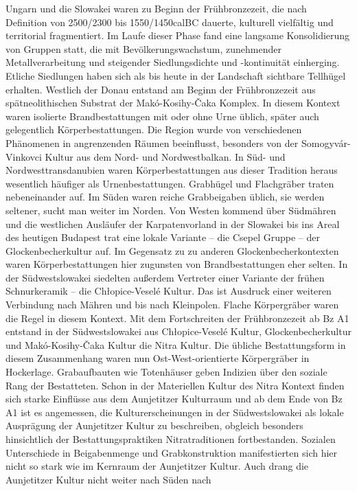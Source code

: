 \documentclass[openany,twoside,twocolumn]{book}
\begin{document}
Ungarn und die Slowakei waren zu Beginn der Frühbronzezeit, die nach
Definition von 2500/2300 bis 1550/1450calBC dauerte, kulturell
vielfältig und territorial fragmentiert. Im Laufe dieser Phase fand eine
langsame Konsolidierung von Gruppen statt, die mit Bevölkerungswachstum,
zunehmender Metallverarbeitung und steigender Siedlungsdichte und
-kontinuität einherging. Etliche Siedlungen haben sich als bis heute in
der Landschaft sichtbare Tellhügel erhalten. Westlich der Donau entstand
am Beginn der Frühbronzezeit aus spätneolithischen Substrat der
Makó-Kosihy-Čaka Komplex. In diesem Kontext waren isolierte
Brandbestattungen mit oder ohne Urne üblich, später auch gelegentlich
Körperbestattungen. Die Region wurde von verschiedenen Phänomenen in
angrenzenden Räumen beeinflusst, besonders von der Somogyvár-Vinkovci
Kultur aus dem Nord- und Nordwestbalkan. In Süd- und
Nordwesttransdanubien waren Körperbestattungen aus dieser Tradition
heraus wesentlich häufiger als Urnenbestattungen. Grabhügel und
Flachgräber traten nebeneinander auf. Im Süden waren reiche Grabbeigaben
üblich, sie werden seltener, sucht man weiter im Norden. Von Westen
kommend über Südmähren und die westlichen Ausläufer der Karpatenvorland
in der Slowakei bis ins Areal des heutigen Budapest trat eine lokale
Variante -- die Csepel Gruppe -- der Glockenbecherkultur auf. Im
Gegensatz zu zu anderen Glockenbecherkontexten waren Körperbestattungen
hier zugunsten von Brandbestattungen eher selten. In der Südwestslowakei
siedelten außerdem Vertreter einer Variante der frühen Schnurkeramik --
die Chłopice-Veselé Kultur. Das ist Ausdruck einer weiteren Verbindung
nach Mähren und bis nach Kleinpolen. Flache Körpergräber waren die Regel
in diesem Kontext. Mit dem Fortschreiten der Frühbronzezeit ab Bz A1
entstand in der Südwestslowakei aus Chłopice-Veselé Kultur,
Glockenbecherkultur und Makó-Kosihy-Čaka Kultur die Nitra Kultur. Die
übliche Bestattungsform in diesem Zusammenhang waren nun
Ost-West-orientierte Körpergräber in Hockerlage. Grabaufbauten wie
Totenhäuser geben Indizien über den soziale Rang der Bestatteten. Schon
in der Materiellen Kultur des Nitra Kontext finden sich starke Einflüsse
aus dem Aunjetitzer Kulturraum und ab dem Ende von Bz A1 ist es
angemessen, die Kulturerscheinungen in der Südwestslowakei als lokale
Ausprägung der Aunjetitzer Kultur zu beschreiben, obgleich besonders
hinsichtlich der Bestattungspraktiken Nitratraditionen fortbestanden.
Sozialen Unterschiede in Beigabenmenge und Grabkonstruktion
manifestierten sich hier nicht so stark wie im Kernraum der Aunjetitzer
Kultur. Auch drang die Aunjetitzer Kultur nicht weiter nach Süden nach
\end{document}

